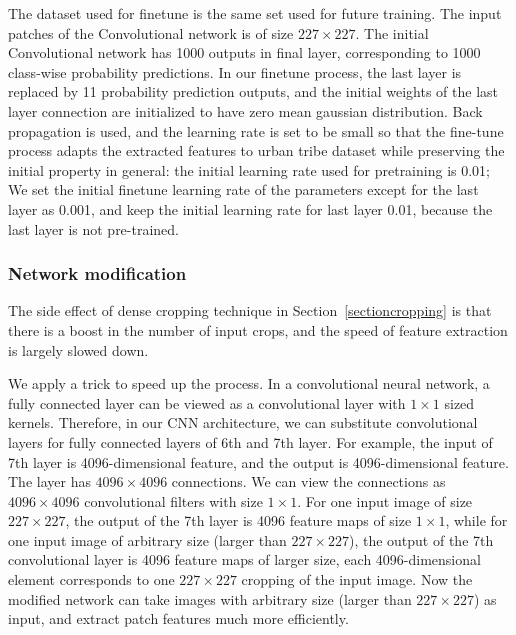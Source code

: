 \documentclass[10pt,twocolumn,letterpaper]{article}
\begin{document}
The dataset used for finetune is the same set used for future training. The input patches of the Convolutional network is of size $227 \times 227$. The initial Convolutional network has 1000 outputs in final layer, corresponding to 1000 class-wise probability predictions. In our finetune process, the last layer is replaced by 11 probability prediction outputs, and the initial weights of the last layer connection are initialized to have zero mean gaussian distribution. Back propagation is used, and the learning rate is set to be small so that the fine-tune process adapts the extracted features to urban tribe dataset while preserving the initial property in general: the initial learning rate used for pretraining is 0.01; We set the initial finetune learning rate of the parameters except for the last layer as 0.001, and keep the initial learning rate for last layer 0.01, because the last layer is not pre-trained.


\subsubsection{Network modification}
The side effect of dense cropping technique in Section~\ref{sectioncropping} is that there is a boost in the number of input crops, and the speed of feature extraction is largely slowed down. 

We apply a trick to speed up the process. In a convolutional neural network, a fully connected layer can be viewed as a convolutional layer with $1\times1$ sized kernels. Therefore, in our CNN architecture, we can substitute convolutional layers for fully connected layers of 6th and 7th layer. For example, the input of 7th layer is 4096-dimensional feature, and the output is 4096-dimensional feature. The layer has $4096\times 4096$ connections. We can view the connections as $4096\times 4096$ convolutional filters with size $1\times1$. For one input image of size $227\times227$, the output of the 7th layer is 4096 feature maps of size $1\times1$, while for one input image of arbitrary size (larger than $227\times227$), the output of the 7th convolutional layer is 4096 feature maps of larger size, each 4096-dimensional element corresponds to one $227\times227$ cropping of the input image. Now the modified network can take images with arbitrary size (larger than $227\times227$) as input, and extract patch features much more efficiently. 
\end{document}
